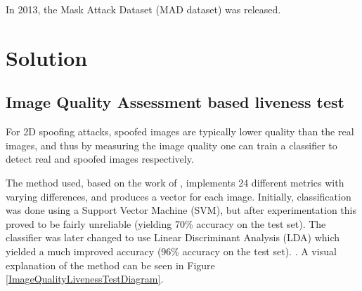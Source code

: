 \documentclass[10pt,a4paper]{article}
\begin{document}
        In 2013, the Mask Attack Dataset (MAD dataset) was released. \cite{3DMadDataset}



\section{Solution}
    \subsection{Image Quality Assessment based liveness test}
        For 2D spoofing attacks, spoofed images are typically lower quality than the real images, and thus by measuring the image quality
        one can train a classifier to detect real and spoofed images respectively.

        The method used, based on the work of \citet{ImageQualityAssessmentTest}, implements 24 different metrics with varying differences, and produces
        a vector for each image. Initially, classification was done using a Support Vector Machine (SVM), but after experimentation this proved to be fairly
        unreliable (yielding 70\% accuracy on the test set). The classifier was later changed to use Linear Discriminant Analysis (LDA) which yielded a much improved
        accuracy (96\% accuracy on the test set). .
        A visual explanation of the method can be seen in Figure \ref{ImageQualityLivenessTestDiagram}. 

\end{document}

